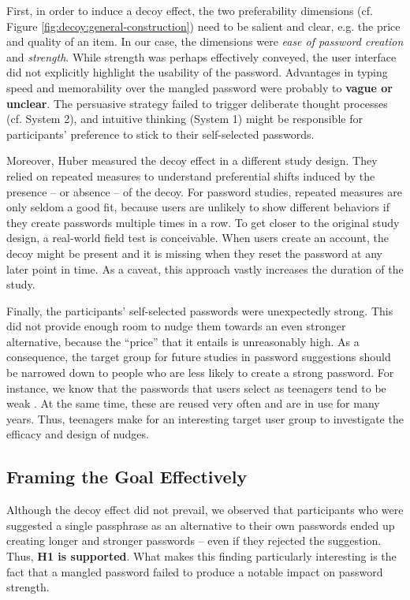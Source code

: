 First, in order to induce a decoy effect, the two preferability dimensions (cf. Figure \ref{fig:decoy:general-construction}) need to be salient and clear, e.g. the price and quality of an item. In our case, the dimensions were \textit{ease of password creation} and \textit{strength}. While strength was perhaps effectively conveyed, the user interface did not explicitly highlight the usability of the password. Advantages in typing speed and memorability over the mangled password were probably to \textbf{vague or unclear}. The persuasive strategy failed to trigger deliberate thought processes (cf. System 2), and intuitive thinking (System 1) might be responsible for participants' preference to stick to their self-selected passwords. 

Moreover, Huber \etal measured the decoy effect in a different study design. They relied on repeated measures to understand preferential shifts induced by the presence -- or absence -- of the decoy. For password studies, repeated measures are only seldom a good fit, because users are unlikely to show different behaviors if they create passwords multiple times in a row. To get closer to the original study design, a real-world field test is conceivable. When users create an account, the decoy might be present and it is missing when they reset the password at any later point in time. As a caveat, this approach vastly increases the duration of the study. 

Finally, the participants' self-selected passwords were unexpectedly strong. This did not provide enough room to nudge them towards an even stronger alternative, because the ``price'' that it entails is unreasonably high. As a consequence, the target group for future studies in password suggestions should be narrowed down to people who are less likely to create a strong password. For instance, we know that the passwords that users select as teenagers tend to be weak \cite{VonZezschwitz2013SurvivalShortest}. At the same time, these are reused very often and are in use for many years. Thus, teenagers make for an interesting target user group to investigate the efficacy and design of nudges. 


\subsection{Framing the Goal Effectively}
Although the decoy effect did not prevail, we observed that participants who were suggested a single passphrase as an alternative to their own passwords ended up creating longer and stronger passwords -- even if they rejected the suggestion. Thus, \textbf{H1 is supported}. What makes this finding particularly interesting is the fact that a mangled password failed to produce a notable impact on password strength. 

